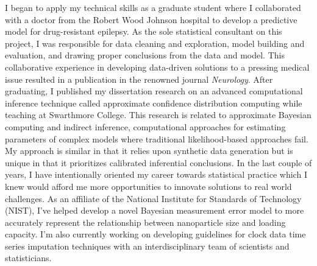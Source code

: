 \documentclass[11pt,a4paper,sans]{moderncv}
\begin{document}

	I began to apply my technical skills as a graduate student where I collaborated with a doctor from the Robert Wood Johnson hospital to develop a predictive model for drug-resistant epilepsy. As the sole statistical consultant on this project, I was responsible for data cleaning and exploration, model building and evaluation, and drawing proper conclusions from the data and model. This collaborative experience in developing data-driven solutions to a pressing medical issue resulted in a publication in the renowned journal \emph{Neurology}. After graduating, I published my dissertation research on an advanced computational inference technique called approximate confidence distribution computing while teaching at Swarthmore College. This research is related to approximate Bayesian computing and indirect inference, computational approaches for estimating parameters of complex models where traditional likelihood-based approaches fail. My approach is similar in that it relies upon synthetic data generation but is unique in that it prioritizes calibrated inferential conclusions. In the last couple of years, I have intentionally oriented my career towards statistical practice which I knew would afford me more opportunities to innovate solutions to real world challenges. As an affiliate of the National Institute for Standards of Technology (NIST), I've helped develop a novel Bayesian measurement error model to more accurately represent the relationship between nanoparticle size and loading capacity. I'm also currently working on developing guidelines for clock data time series imputation techniques with an interdisciplinary team of scientists and statisticians.
\end{document}
